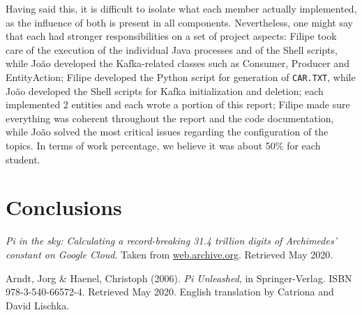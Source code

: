 \documentclass[12pt]{article}
\begin{document}
Having said this, it is difficult to isolate what each member actually implemented, as the influence of both is present in all components.
Nevertheless, one might say that each had stronger responsibilities on a set of project aspects:
Filipe took care of the execution of the individual Java processes and of the Shell scripts, while João developed the Kafka-related classes such as Consumer,
Producer and EntityAction; Filipe developed the Python script for generation of \texttt{CAR.TXT}, while João developed the Shell scripts for Kafka initialization
and deletion; each implemented 2 entities and each wrote a portion of this report; Filipe made sure everything was coherent throughout the report and the code
documentation, while João solved the most critical issues regarding the configuration of the topics.
In terms of work percentage, we believe it was about 50\% for each student.

\newpage
\section*{Conclusions} \label{conclusions} %

\begin{thebibliography}{9} %
  

  \textit{Pi in the sky: Calculating a record-breaking 31.4 trillion digits of Archimedes' constant on Google Cloud}.
  Taken from \href{https://web.archive.org/web/20191019023120/https://cloud.google.com/blog/products/compute/calculating-31-4-trillion-digits-of-archimedes-constant-on-google-cloud}{web.archive.org}.
  Retrieved May 2020.

  Arndt, Jorg \& Haenel, Christoph (2006).
  \textit{Pi Unleashed}, in Springer-Verlag.
  ISBN 978-3-540-66572-4.
  Retrieved May 2020.
  English translation by Catriona and David Lischka.


\end{thebibliography}

\clearpage
\end{document}
